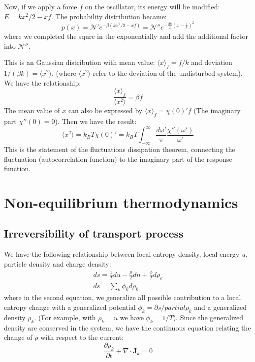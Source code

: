\documentclass{article}
\newcommand{\pfrac}[2]{\frac{\partial #1}{\partial #2}}
\begin{document}
Now, if we apply a force $f$ on the oscillator, its energy will be modified:
$E = kx^2/2 - xf$. The probability distribution became:
\begin{equation}
    p(x) = \mathcal{N}' e^{-\beta(kx^2/2 - xf)} = \mathcal{N}'' e^{-\frac{\beta k}{2} (x - \frac{f}{k})^2 }
\end{equation}
where we completed the squre in the exponentially and add the additional 
factor into $\mathcal{N}''$. 

This is an Gaussian distribution with mean value: $\langle x \rangle_f = f/k$ and 
deviation $1/(\beta k) = \langle x^2 \rangle$. (where $\langle x^2 \rangle$ refer to the 
deviation of the undisturbed system). 
We have the relationship:
\begin{equation}
    \frac{\langle x \rangle_f}{\langle x^2 \rangle} = \beta f
\end{equation}
The mean value of $x$ can also be expressed by $\langle x \rangle_f = \chi(0)' f $
(The imaginary part $\chi''(0) = 0$). Then we have the result:
\begin{equation}
    \langle x^2 \rangle = k_B T \chi(0)' = 
    k_BT\int_{-\infty}^{\infty} \frac{d\omega'}{\pi} \frac{\chi''(\omega')}{\omega'} 
\end{equation}
This is the statement of the fluctuations dissipation theorem, connecting the 
fluctuation (autocorrelation function) to the imaginary part of the response function.

\section{Non-equilibrium thermodynamics}
\subsection*{Irreversibility of transport process}
We have the following relationship between local entropy density, local energy $u$, particle density and 
charge density:
\begin{gather}
    ds = \frac{1}{T} du - \frac{\mu}{T} dn + \frac{\phi}{T} d\rho_e \\
    ds = \sum_k \phi_k d\rho_k
\end{gather}
where in the second equation, we generalize all possible contribution to a local entropy change 
with a generalized potential $\phi_k = \partial s / partial \rho_k$ and a generalized density $\rho_k$. 
(For example, with $\rho_k = u$ we have $\phi_k = 1/T$). 
Since the generalized density are conserved in the system, we have the continuous equation relating the 
change of $\rho$ with respect to the current:
\begin{equation}
    \pfrac{\rho_k}{t} + \nabla \cdot \mathbf{J}_{k} = 0
\end{equation}
\end{document}
